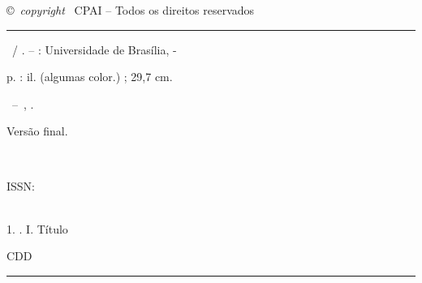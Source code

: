 %


{
\ABNTEXchapterfont\setlength{\parindent}{0cm}

\vspace*{\fill} 

{\tiny \copyright\ \textit{copyright} \the\year\ CPAI -- Todos os direitos reservados}


\vspace*{\fill} %

\begin{fichacatalografica}\ABNTEXchapterfont
    \vspace*{\fill} %
    \hrule %
    \begin{center} %
        \begin{minipage}[c]{13cm} %
            \hspace{0.5cm} \rttitulo\ / \rtautor. --
            \imprimirlocal : Universidade de Brasília, \rtdata-
            
            \hspace{0.5cm} \pageref{LastPage} p. : il. (algumas color.) ; 29,7 cm.\\
            
            \hspace{0.5cm}
            \parbox[t]{\textwidth}{\rttipo~--~\CPAI, \rtdata.}
            
            \hspace{0.5cm}
            \parbox[t]{\textwidth}{Versão final.}\\
            
            \hspace{0.5cm}
            \parbox[t]{\textwidth}{ISSN: \rtissn}\\
            
            \hspace{0.5cm}
            1. . \rtkeywordb
            I. Título

            \begin{flushright}
                 CDD \rtcdd
            \end{flushright}
        \end{minipage}
    \end{center}
    \hrule
\end{fichacatalografica}

\cleardoublepage
}

